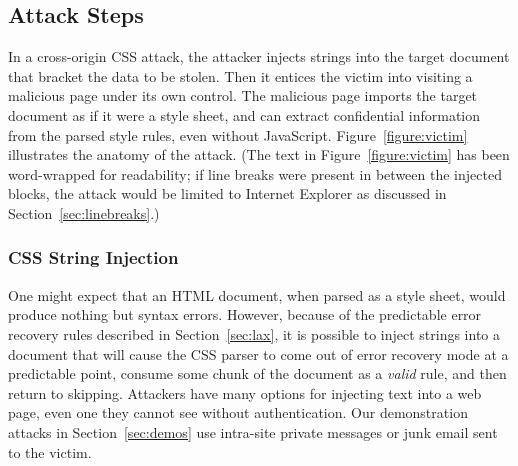 \documentclass{acm_proc_article-sp}
\begin{document}
\subsection{Attack Steps}

In a cross-origin CSS attack, the attacker injects strings into the
target document that bracket the data to be stolen.  Then it entices
the victim into visiting a malicious page under its own control.  The
malicious page imports the target document as if it were a style
sheet, and can extract confidential information from the parsed style
rules, even without JavaScript.  Figure~\ref{figure:victim}
illustrates the anatomy of the attack. (The text in
Figure~\ref{figure:victim} has been word-wrapped for readability; if
line breaks were present in between the injected blocks, the attack
would be limited to Internet Explorer as discussed in Section~\ref{sec:linebreaks}.)

\subsubsection{CSS String Injection}
One might expect that an HTML document, when parsed as a style sheet,
would produce nothing but syntax errors.  However, because of the
predictable error recovery rules described in Section~\ref{sec:lax},
it is possible to inject strings into a document that will cause the
CSS parser to come out of error recovery mode at a predictable point,
consume some chunk of the document as a \emph{valid} rule, and then
return to skipping.  Attackers have many options for injecting text
into a web page, even one they cannot see without authentication.
Our demonstration attacks in Section~\ref{sec:demos} use
intra-site private messages or junk email sent to the victim.
\end{document}
